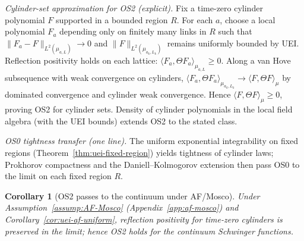 \documentclass[11pt]{amsart}
\theoremstyle{plain}
\newtheorem{corollary}[theorem]{Corollary}
\theoremstyle{definition}
\theoremstyle{remark}
\begin{document}
\noindent\emph{Cylinder-set approximation for OS2 (explicit).} Fix a time-zero cylinder polynomial $F$ supported in a bounded region $R$. For each $a$, choose a local polynomial $F_a$ depending only on finitely many links in $R$ such that $\|F_a-F\|_{L^2(\mu_{a,L})}\to 0$ and $\|F\|_{L^2(\mu_{a_k,L_k})}$ remains uniformly bounded by UEI. Reflection positivity holds on each lattice: $\langle F_a,\Theta F_a\rangle_{\mu_{a,L}}\ge 0$. Along a van Hove subsequence with weak convergence on cylinders, $\langle F_a,\Theta F_a\rangle_{\mu_{a_k,L_k}}\to \langle F,\Theta F\rangle_{\mu}$ by dominated convergence and cylinder weak convergence. Hence $\langle F,\Theta F\rangle_{\mu}\ge 0$, proving OS2 for cylinder sets. Density of cylinder polynomials in the local field algebra (with the UEI bounds) extends OS2 to the stated class.

\noindent\emph{OS0 tightness transfer (one line).} The uniform exponential integrability on fixed regions (Theorem~\ref{thm:uei-fixed-region}) yields tightness of cylinder laws; Prokhorov compactness and the Daniell--Kolmogorov extension then pass OS0 to the limit on each fixed region $R$.

\begin{corollary}[OS2 passes to the continuum under AF/Mosco]\label{cor:os2-pass}
Under Assumption~\ref{assump:AF-Mosco} (Appendix~\ref{app:af-mosco}) and Corollary~\ref{cor:uei-af-uniform}, reflection positivity for time-zero cylinders is preserved in the limit; hence OS2 holds for the continuum Schwinger functions.
\end{corollary}
\end{document}
